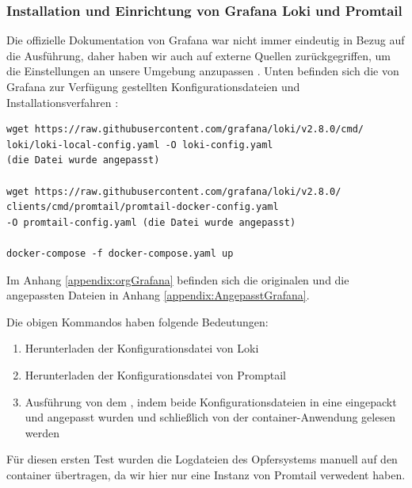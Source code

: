 \newpage
\subsubsection{Installation und Einrichtung von Grafana Loki und Promtail}
Die offizielle Dokumentation von Grafana war nicht immer eindeutig in Bezug auf die Ausführung, daher haben wir auch auf externe Quellen zurückgegriffen, um die Einstellungen an unsere Umgebung anzupassen \citep{Polinowski_PGL}. Unten befinden sich die von Grafana zur Verfügung gestellten Konfigurationsdateien und Installationsverfahren \citep{GrafanaLoki_run}:

{
\begin{lstlisting}[frame=single]
wget https://raw.githubusercontent.com/grafana/loki/v2.8.0/cmd/
loki/loki-local-config.yaml -O loki-config.yaml
(die Datei wurde angepasst)

wget https://raw.githubusercontent.com/grafana/loki/v2.8.0/
clients/cmd/promtail/promtail-docker-config.yaml
-O promtail-config.yaml (die Datei wurde angepasst)

docker-compose -f docker-compose.yaml up 
\end{lstlisting}
}

Im Anhang \ref{appendix:orgGrafana} befinden sich die originalen und die angepassten Dateien in Anhang \ref{appendix:AngepasstGrafana}.

Die obigen Kommandos haben folgende Bedeutungen:
\begin{enumerate}[noitemsep]
   \item Herunterladen der Konfigurationsdatei von Loki
   \item Herunterladen der Konfigurationsdatei von Promptail
   \item Ausführung von dem , indem beide Konfigurationsdateien in eine eingepackt und angepasst wurden und schließlich von der \gls{container}-Anwendung gelesen werden
\end{enumerate}


Für diesen ersten Test wurden die Logdateien des Opfersystems manuell auf den \gls{container} übertragen, da wir hier nur eine Instanz von Promtail verwedent haben.

